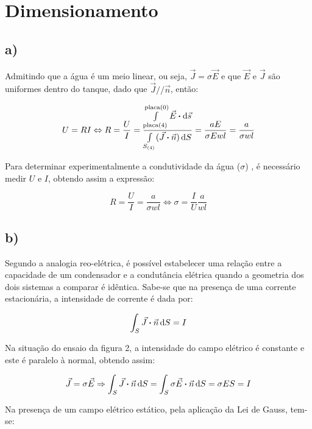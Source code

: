 \documentclass[11pt, a4paper, titlepage, portuguese]{article}
\newcommand{\eq}{\Leftrightarrow} %
\begin{document}
	\section{Dimensionamento}
	\subsection{a)}

		\par
		Admitindo que a água é um meio linear, ou seja, $\vec{J} = \sigma \vec{E}$ e que $\vec{E}$ e $\vec{J}$ são uniformes dentro do tanque, dado que $\vec{J} // \vec{n}$, então:

		$$ U = RI \eq R = \dfrac{U}{I} = \dfrac{\int\limits_{\text{placa}(4)}^{\text{placa}(0)} \vec{E} \vdot \dd{\vec{s}}}{\int\limits_{S_{(4)}}(\vec{J} \vdot \vec{n})\dd{S}} = \dfrac{aE}{\sigma Ewl} = \dfrac{a}{\sigma wl}$$
		\par
		Para determinar experimentalmente a condutividade da água ($\sigma$) , é necessário medir $U$ e $I$, obtendo assim a expressão:

		$$ R = \frac{U}{I} = \dfrac{a}{\sigma wl} \eq \sigma = \frac{I}{U} \dfrac{a}{wl}$$

	\subsection{b)}

	\par
	Segundo a analogia reo-elétrica, é possível estabelecer uma relação entre a capacidade de um condensador e a condutância elétrica quando a geometria dos dois sistemas a comparar é idêntica.
	Sabe-se que na presença de uma corrente estacionária, a intensidade de corrente é dada por:

	\begin{align*}
		\int_S \vec{J} \vdot \vec{n}\dd{S} = I
	\end{align*}

	\par
	Na situação do ensaio da figura 2, a intensidade do campo elétrico é constante e este é paralelo à normal, obtendo assim:

	\begin{align*}
		\vec{J} = \sigma \vec{E} \Rightarrow \int_S \vec{J} \vdot \vec{n} \dd{S} = \int_S \sigma \vec{E} \vdot \vec{n} \dd{S}  = \sigma E S = I
	\end{align*}

	\par
	Na presença de um campo elétrico estático, pela aplicação da Lei de Gauss, tem-se:
\end{document}
